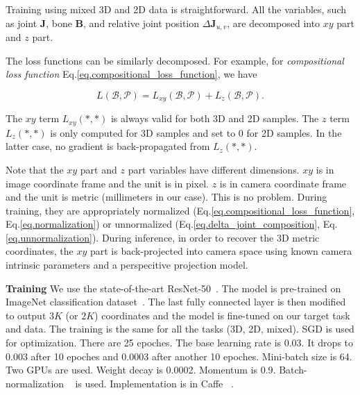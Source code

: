\documentclass[10pt,twocolumn,letterpaper]{article}
\begin{document}
Training using mixed 3D and 2D data is straightforward. All the variables, such as joint $\mathbf{J}$, bone $\mathbf{B}$, and relative joint position $\Delta\mathbf{J}_{u,v}$, are decomposed into $xy$ part and $z$ part.

\begin{comment}
\begin{equation}
\Delta\mathbf{J}_{u,v} = [\Delta\mathbf{J}_{u,v}^{(xy)}, \Delta\mathbf{J}_{u,v}^{(z)}].\\
\label{eq.separate_2d_3d}
\end{equation}
\end{comment}

The loss functions can be similarly decomposed. For example, for \emph{compositional loss function} Eq.\eqref{eq.compositional_loss_function}, we have

\begin{equation}
L(\mathcal{B},\mathcal{P}) = L_{xy}(\mathcal{B},\mathcal{P}) + L_{z}(\mathcal{B},\mathcal{P}).
\label{eq.loss_2d_plus_3d}
\end{equation}

The $xy$ term $L_{xy}(*,*)$ is always valid for both 3D and 2D samples. The $z$ term $L_{z}(*,*)$ is only computed for 3D samples and set to $0$ for 2D samples. In the latter case, no gradient is back-propagated from $L_{z}(*,*)$.


Note that the $xy$ part and $z$ part variables have different dimensions. $xy$ is in image coordinate frame and the unit is in pixel. $z$ is in camera coordinate frame and the unit is metric (millimeters in our case). This is no problem. During training, they are appropriately normalized (Eq.\eqref{eq.compositional_loss_function}, Eq.\eqref{eq.normalization}) or unnormalized (Eq.\eqref{eq.delta_joint_composition}, Eq.\eqref{eq.unnormalization}). During inference, in order to recover the 3D metric coordinates, the $xy$ part is back-projected into camera space using known camera intrinsic parameters and a perspecitive projection model.

\textbf{Training} We use the state-of-the-art ResNet-50~\cite{he2016deep}. The model is pre-trained on ImageNet classification dataset~\cite{deng2009imagenet}. The last fully connected layer is then modified to output $3K$ (or $2K$) coordinates and the model is fine-tuned on our target task and data. The training is the same for all the tasks (3D, 2D, mixed). SGD is used for optimization. There are 25 epoches. The base learning rate is 0.03. It drops to 0.003 after 10 epoches and 0.0003 after another 10 epoches. Mini-batch size is 64. Two GPUs are used. Weight decay is 0.0002. Momentum is 0.9. Batch-normalization ~\cite{ioffe2015batch} is used. Implementation is in Caffe ~\cite{jia2014caffe}.
\end{document}

